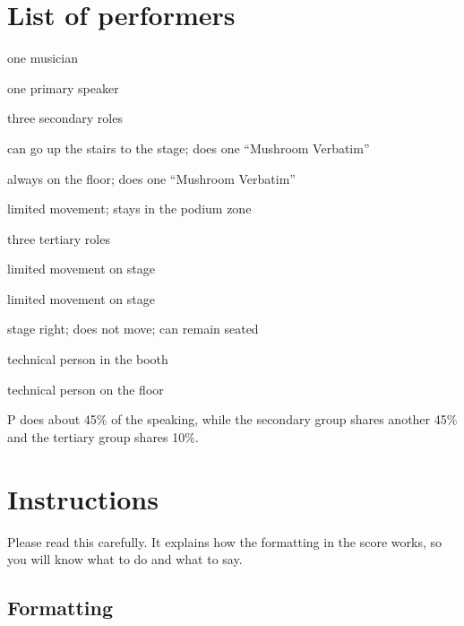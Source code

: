 \section{List of performers}

\begin{description}[align=right,labelwidth=2cm]

  \item [M] one musician
  \item [P] one primary speaker
  \item [S] three secondary roles
  \begin{description}[align=right,labelwidth=2cm]
    \item [S1] can go up the stairs to the stage; does one ``Mushroom Verbatim''
    \item [S2] always on the floor; does one ``Mushroom Verbatim''
    \item [S3] limited movement; stays in the podium zone
  \end{description}
  \item [T] three tertiary roles
  \begin{description}[align=right,labelwidth=2cm]
    \item [T1] limited movement on stage
    \item [T2] limited movement on stage
    \item [T3]  stage right; does not move; can remain seated
  \end{description}
  \item [Q] technical person in the booth
  \item [R] technical person on the floor

\end{description}

P does about 45\% of the speaking, while the secondary group shares another 45\% and the tertiary group shares 10\%.

\newpage

\section{Instructions}

Please read this carefully.  It explains how the formatting in the score works, so you will know what to do and what to say.

\subsection*{Formatting}

